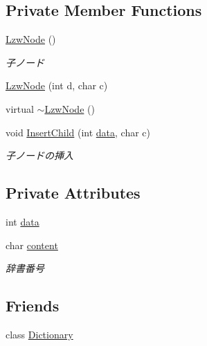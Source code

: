 \subsection*{Private Member Functions}
\begin{DoxyCompactItemize}
\item 
\hyperlink{classprdc__lzw_1_1LzwNode_aecd8429cfcb52da0c5a88c2eb2ce8f17}{Lzw\-Node} ()
\begin{DoxyCompactList}\small\item\em 子ノード \end{DoxyCompactList}\item 
\hyperlink{classprdc__lzw_1_1LzwNode_ab376216cc0c3c4893de9cc82e193bc0a}{Lzw\-Node} (int d, char c)
\item 
virtual \hyperlink{classprdc__lzw_1_1LzwNode_ab7c9e93839328025287d465734dfba4a}{$\sim$\-Lzw\-Node} ()
\item 
void \hyperlink{classprdc__lzw_1_1LzwNode_adcb9f453effcb8fac95bb08a59665eb7}{Insert\-Child} (int \hyperlink{classprdc__lzw_1_1LzwNode_ac85178681ea1181b22c3ac43af32515a}{data}, char c)
\begin{DoxyCompactList}\small\item\em 子ノードの挿入 \end{DoxyCompactList}\end{DoxyCompactItemize}
\subsection*{Private Attributes}
\begin{DoxyCompactItemize}
\item 
int \hyperlink{classprdc__lzw_1_1LzwNode_ac85178681ea1181b22c3ac43af32515a}{data}
\item 
char \hyperlink{classprdc__lzw_1_1LzwNode_acb2b7cb34053125cfdf7595aba9bc172}{content}
\begin{DoxyCompactList}\small\item\em 辞書番号 \end{DoxyCompactList}\end{DoxyCompactItemize}
\subsection*{Friends}
\begin{DoxyCompactItemize}
\item 
class \hyperlink{classprdc__lzw_1_1LzwNode_a61780a02d5e0994eb40a4b79f9c007ad}{Dictionary}
\end{DoxyCompactItemize}



